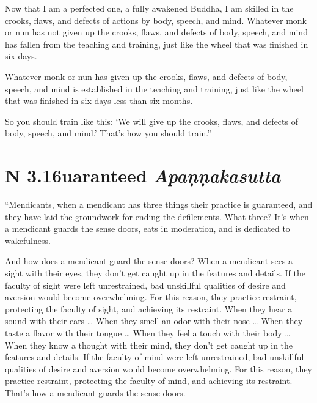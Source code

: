\documentclass[12pt,openany]{book}%
\newcommand*{\suttatitleacronym}[1]{\smaller[2]{#1}\vspace*{.3em}}
\newcommand*{\suttatitletranslation}[1]{\linebreak{#1}}
\newcommand*{\suttatitleroot}[1]{\linebreak\smaller[2]\itshape{#1}}
\newcommand*{\tocacronym}[1]{\hspace*{-3.3em}{#1}\quad}
\newcommand*{\toctranslation}[1]{#1}
\newcommand*{\tocroot}[1]{(\textit{#1})}
\begin{document}
Now that I am a perfected one, a fully awakened Buddha, I am skilled in the crooks, flaws, and defects of actions by body, speech, and mind. Whatever monk or nun has not given up the crooks, flaws, and defects of body, speech, and mind has fallen from the teaching and training, just like the wheel that was finished in six days. 

Whatever monk or nun has given up the crooks, flaws, and defects of body, speech, and mind is established in the teaching and training, just like the wheel that was finished in six days less than six months. 

So you should train like this: ‘We will give up the crooks, flaws, and defects of body, speech, and mind.’ That’s how you should train.” 

%
\section*{{\suttatitleacronym AN 3.16}{\suttatitletranslation Guaranteed }{\suttatitleroot Apaṇṇakasutta}}
\addcontentsline{toc}{section}{\tocacronym{AN 3.16} \toctranslation{Guaranteed } \tocroot{Apaṇṇakasutta}}

“Mendicants, when a mendicant has three things their practice is guaranteed, and they have laid the groundwork for ending the defilements. What three? It’s when a mendicant guards the sense doors, eats in moderation, and is dedicated to wakefulness. 

And how does a mendicant guard the sense doors? When a mendicant sees a sight with their eyes, they don’t get caught up in the features and details. If the faculty of sight were left unrestrained, bad unskillful qualities of desire and aversion would become overwhelming. For this reason, they practice restraint, protecting the faculty of sight, and achieving its restraint. When they hear a sound with their ears … When they smell an odor with their nose … When they taste a flavor with their tongue … When they feel a touch with their body … When they know a thought with their mind, they don’t get caught up in the features and details. If the faculty of mind were left unrestrained, bad unskillful qualities of desire and aversion would become overwhelming. For this reason, they practice restraint, protecting the faculty of mind, and achieving its restraint. That’s how a mendicant guards the sense doors. 
\end{document}
